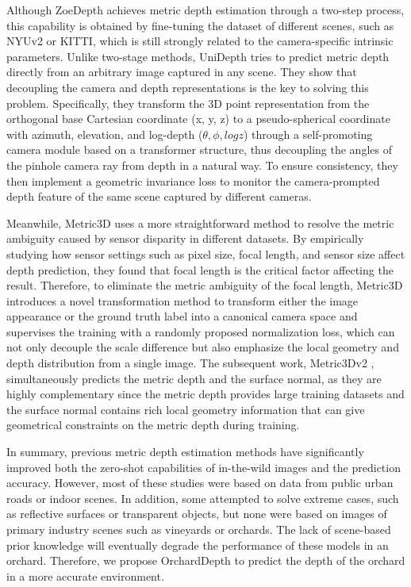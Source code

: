 Although ZoeDepth achieves metric depth estimation through a two-step process, this capability is obtained by fine-tuning the dataset of different scenes, such as NYUv2 or KITTI, which is still strongly related to the camera-specific intrinsic parameters. Unlike two-stage methods, UniDepth\cite{piccinelli2024unidepth} tries to predict metric depth directly from an arbitrary image captured in any scene. They show that decoupling the camera and depth representations is the key to solving this problem. Specifically, they transform the 3D point representation from the orthogonal base Cartesian coordinate (x, y, z) to a pseudo-spherical coordinate with azimuth, elevation, and log-depth ($\theta, \phi, logz$) through a self-promoting camera module based on a transformer structure, thus decoupling the angles of the pinhole camera ray from depth in a natural way. To ensure consistency, they then implement a geometric invariance loss to monitor the camera-prompted depth feature of the same scene captured by different cameras.

Meanwhile, Metric3D\cite{yin2023metric} uses a more straightforward method to resolve the metric ambiguity caused by sensor disparity in different datasets. By empirically studying how sensor settings such as pixel size, focal length, and sensor size affect depth prediction, they found that focal length is the critical factor affecting the result. Therefore, to eliminate the metric ambiguity of the focal length, Metric3D introduces a novel transformation method to transform either the image appearance or the ground truth label into a canonical camera space and supervises the training with a randomly proposed normalization loss, which can not only decouple the scale difference but also emphasize the local geometry and depth distribution from a single image. The subsequent work, Metric3Dv2 \cite{hu2024metric3dv2}, simultaneously predicts the metric depth and the surface normal, as they are highly complementary since the metric depth provides large training datasets and the surface normal contains rich local geometry information that can give geometrical constraints on the metric depth during training.

In summary, previous metric depth estimation methods have significantly improved both the zero-shot capabilities of in-the-wild images and the prediction accuracy. However, most of these studies were based on data from public urban roads or indoor scenes. In addition, some attempted to solve extreme cases, such as reflective surfaces or transparent objects, but none were based on images of primary industry scenes such as vineyards or orchards. The lack of scene-based prior knowledge will eventually degrade the performance of these models in an orchard. Therefore, we propose OrchardDepth to predict the depth of the orchard in a more accurate environment.

